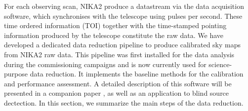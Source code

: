 

For each observing scan, NIKA2 produce a datastream via the data
acquisition software, which synchronises with the telescope using
pulses per second. These time ordered information (TOI) together with
the time-stamped pointing information produced by the telescope
constitute the raw data. We have developed a dedicated data reduction pipeline to
produce calibrated sky maps from NIKA2 raw data. This pipeline was first 
installed for the data analysis during the commissioning campaigns and is
now currently used for science-purpose data reduction. It implements
the baseline methods for the calibration and performance assessment.
A detailed description of this software will be presented in a companion
paper \citep{Ponthieu2019}, as well as an application to blind source
dectection. In this section, we summarize the main steps of the data
reduction.
 







